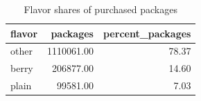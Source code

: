 \begin{table}
\caption{Flavor shares of purchased packages}
\begin{tabular}{lrr}
\toprule
flavor & packages & percent\_packages \\
\midrule
other & 1110061.00 & 78.37 \\
berry & 206877.00 & 14.60 \\
plain & 99581.00 & 7.03 \\
\bottomrule
\end{tabular}
\end{table}
